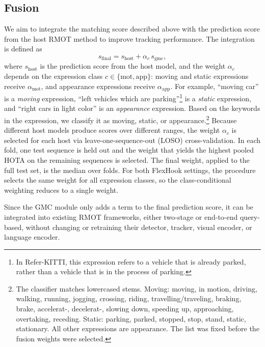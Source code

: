 \documentclass{article}
\begin{document}
\subsection{Fusion}
\label{sec:fusion}
We aim to integrate the matching score described above with the prediction score from the host RMOT method to improve tracking performance. The integration is defined as
\begin{equation}
  s_{\mathrm{final}} = s_{\mathrm{host}} + \alpha_{c}\,s_{\mathrm{gmc}},
  \label{eq:fusion}
\end{equation}
where $s_{\mathrm{host}}$ is the prediction score from the host model, and the weight $\alpha_c$ depends on the expression class $c \in \{\mathrm{mot},\mathrm{app}\}$: moving and static expressions receive $\alpha_{\mathrm{mot}}$, and appearance expressions receive $\alpha_{\mathrm{app}}$. For example, \enquote{moving car} is a \emph{moving} expression, \enquote{left vehicles which are parking}\footnote{In Refer-KITTI, this expression refers to a vehicle that is already parked, rather than a vehicle that is in the process of parking.} is a \emph{static} expression, and \enquote{right cars in light color} is an \emph{appearance} expression. Based on the keywords in the expression, we classify it as moving, static, or appearance.\footnote{The classifier matches lowercased stems. Moving: moving, in motion, driving, walking, running, jogging, crossing, riding, travelling/traveling, braking, brake, accelerat-, decelerat-, slowing down, speeding up, approaching, overtaking, receding. Static: parking, parked, stopped, stop, stand, static, stationary. All other expressions are appearance. The list was fixed before the fusion weights were selected.} Because different host models produce scores over different ranges, the weight $\alpha_c$ is selected for each host via leave-one-sequence-out (LOSO) cross-validation. In each fold, one test sequence is held out and the weight that yields the highest pooled HOTA on the remaining sequences is selected. The final weight, applied to the full test set, is the median over folds. For both FlexHook settings, the procedure selects the same weight for all expression classes, so the class-conditional weighting reduces to a single weight.

Since the GMC module only adds a term to the final prediction score, it can be integrated into existing RMOT frameworks, either two-stage or end-to-end query-based, without changing or retraining their detector, tracker, visual encoder, or language encoder.
\end{document}
